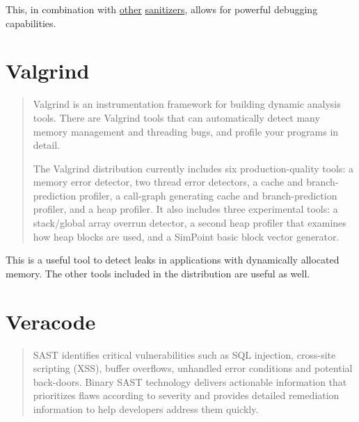 \documentclass[12pt]{article}
\begin{document}
\label{tsan}
This, in combination with \hyperref[asan]{other} \hyperref[msan]{sanitizers},
allows for powerful debugging capabilities.
\cite{tsan}
\section{Valgrind}

\begin{quote}
Valgrind is an instrumentation framework for building dynamic analysis
tools. There are Valgrind tools that can automatically detect many
memory management and threading bugs, and profile your programs in
detail.

The Valgrind distribution currently includes six production-quality
tools: a memory error detector, two thread error detectors,
a cache and branch-prediction profiler, a call-graph generating
cache and branch-prediction profiler, and a heap profiler. It also
includes three experimental tools: a stack/global array overrun
detector, a second heap profiler that examines how heap blocks are
used, and a SimPoint basic block vector generator.
\end{quote}

This is a useful tool to detect leaks in applications with dynamically
allocated memory. The other tools included in the distribution are useful
as well.
\cite{valgrind}
\section{Veracode}

\begin{quote}
SAST identifies critical vulnerabilities such as SQL injection,
cross-site scripting (XSS), buffer overflows, unhandled error
conditions and potential back-doors. Binary SAST technology
delivers actionable information that prioritizes flaws according
to severity and provides detailed remediation information to help
developers address them quickly.
\end{quote}
\end{document}
